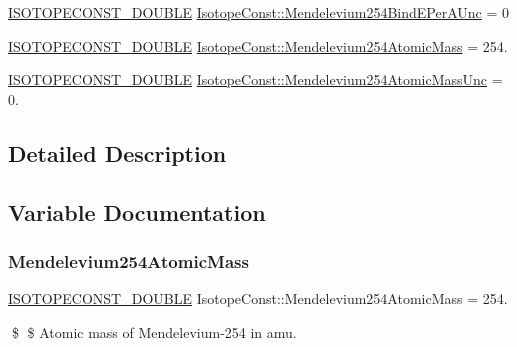 \begin{DoxyCompactItemize}
\item 
\mbox{\hyperlink{group___isotope_const-_macros_ga8f45a7272ce02c0b4c65c44636ed719a}{I\+S\+O\+T\+O\+P\+E\+C\+O\+N\+S\+T\+\_\+\+D\+O\+U\+B\+LE}} \mbox{\hyperlink{group___isotope_const-_mendelevium-_md254_gaa6c5d04ae1e162695fbce854a7f75043}{Isotope\+Const\+::\+Mendelevium254\+Bind\+E\+Per\+A\+Unc}} = 0
\item 
\mbox{\hyperlink{group___isotope_const-_macros_ga8f45a7272ce02c0b4c65c44636ed719a}{I\+S\+O\+T\+O\+P\+E\+C\+O\+N\+S\+T\+\_\+\+D\+O\+U\+B\+LE}} \mbox{\hyperlink{group___isotope_const-_mendelevium-_md254_gae7aac33caca16abcb8f252dbfeb81d0a}{Isotope\+Const\+::\+Mendelevium254\+Atomic\+Mass}} = 254.
\item 
\mbox{\hyperlink{group___isotope_const-_macros_ga8f45a7272ce02c0b4c65c44636ed719a}{I\+S\+O\+T\+O\+P\+E\+C\+O\+N\+S\+T\+\_\+\+D\+O\+U\+B\+LE}} \mbox{\hyperlink{group___isotope_const-_mendelevium-_md254_gae3de03289ee0ebaba8291a35087595a3}{Isotope\+Const\+::\+Mendelevium254\+Atomic\+Mass\+Unc}} = 0.
\end{DoxyCompactItemize}


\subsection{Detailed Description}


\subsection{Variable Documentation}
\mbox{\label{group___isotope_const-_mendelevium-_md254_gae7aac33caca16abcb8f252dbfeb81d0a}} 
\subsubsection{\texorpdfstring{Mendelevium254\+Atomic\+Mass}{Mendelevium254AtomicMass}}
{\footnotesize\ttfamily \mbox{\hyperlink{group___isotope_const-_macros_ga8f45a7272ce02c0b4c65c44636ed719a}{I\+S\+O\+T\+O\+P\+E\+C\+O\+N\+S\+T\+\_\+\+D\+O\+U\+B\+LE}} Isotope\+Const\+::\+Mendelevium254\+Atomic\+Mass = 254.}

\$ \$ Atomic mass of Mendelevium-\/254 in amu. \mbox{\label{group___isotope_const-_mendelevium-_md254_gae3de03289ee0ebaba8291a35087595a3}} 

